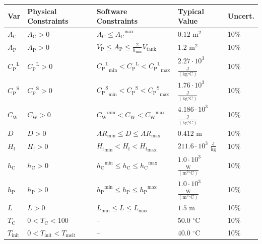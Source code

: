 \documentclass[12pt]{article}
\begin{document}
\begin{longtable}{l l l l l}
\toprule
\textbf{Var} & \textbf{Physical Constraints} & \textbf{Software Constraints} & \textbf{Typical Value} & \textbf{Uncert.}
\\
\midrule
\endhead
${A_{\text{C}}}$ & ${A_{\text{C}}}>0$ & ${A_{\text{C}}}\leq{}{{A_{\text{C}}}^{\text{max}}}$ & $0.12$ $\text{m}^{2}$ & 10$\%$
\\
${A_{\text{P}}}$ & ${A_{\text{P}}}>0$ & ${V_{\text{P}}}\leq{}{A_{\text{P}}}\leq{}\frac{2}{{h_{\text{min}}}} {V_{\text{tank}}}$ & $1.2$ $\text{m}^{2}$ & 10$\%$
\\
${{C_{\text{P}}}^{\text{L}}}$ & ${{C_{\text{P}}}^{\text{L}}}>0$ & ${{{C_{\text{P}}}^{\text{L}}}_{\text{min}}}<{{C_{\text{P}}}^{\text{L}}}<{{{C_{\text{P}}}^{\text{L}}}_{\text{max}}}$ & $2.27\cdot{}10^{3}$ $\frac{\text{J}}{(\text{kg}{}^{\circ}\text{C})}$ & 10$\%$
\\
${{C_{\text{P}}}^{\text{S}}}$ & ${{C_{\text{P}}}^{\text{S}}}>0$ & ${{{C_{\text{P}}}^{\text{S}}}_{\text{min}}}<{{C_{\text{P}}}^{\text{S}}}<{{{C_{\text{P}}}^{\text{S}}}_{\text{max}}}$ & $1.76\cdot{}10^{3}$ $\frac{\text{J}}{(\text{kg}{}^{\circ}\text{C})}$ & 10$\%$
\\
${C_{\text{W}}}$ & ${C_{\text{W}}}>0$ & ${{C_{\text{W}}}^{\text{min}}}<{C_{\text{W}}}<{{C_{\text{W}}}^{\text{max}}}$ & $4.186\cdot{}10^{3}$ $\frac{\text{J}}{(\text{kg}{}^{\circ}\text{C})}$ & 10$\%$
\\
$D$ & $D>0$ & ${AR_{\text{min}}}\leq{}D\leq{}{AR_{\text{max}}}$ & $0.412$ m & 10$\%$
\\
${H_{\text{f}}}$ & ${H_{\text{f}}}>0$ & ${{H_{\text{f}}}_{\text{min}}}<{H_{\text{f}}}<{{H_{\text{f}}}_{\text{max}}}$ & $211.6\cdot{}10^{3}$ $\frac{\text{J}}{\text{kg}}$ & 10$\%$
\\
${h_{\text{C}}}$ & ${h_{\text{C}}}>0$ & ${{h_{\text{C}}}^{\text{min}}}\leq{}{h_{\text{C}}}\leq{}{{h_{\text{C}}}^{\text{max}}}$ & $1.0\cdot{}10^{3}$ $\frac{\text{W}}{(\text{m}^{2}{}^{\circ}\text{C})}$ & 10$\%$
\\
${h_{\text{P}}}$ & ${h_{\text{P}}}>0$ & ${{h_{\text{P}}}^{\text{min}}}\leq{}{h_{\text{P}}}\leq{}{{h_{\text{P}}}^{\text{max}}}$ & $1.0\cdot{}10^{3}$ $\frac{\text{W}}{(\text{m}^{2}{}^{\circ}\text{C})}$ & 10$\%$
\\
$L$ & $L>0$ & ${L_{\text{min}}}\leq{}L\leq{}{L_{\text{max}}}$ & $1.5$ m & 10$\%$
\\
${T_{\text{C}}}$ & $0<{T_{\text{C}}}<100$ & -- & $50.0$ ${}^{\circ}$C & 10$\%$
\\
${T_{\text{init}}}$ & $0<{T_{\text{init}}}<{T_{\text{melt}}}$ & -- & $40.0$ ${}^{\circ}$C & 10$\%$

\end{longtable}
\end{document}
